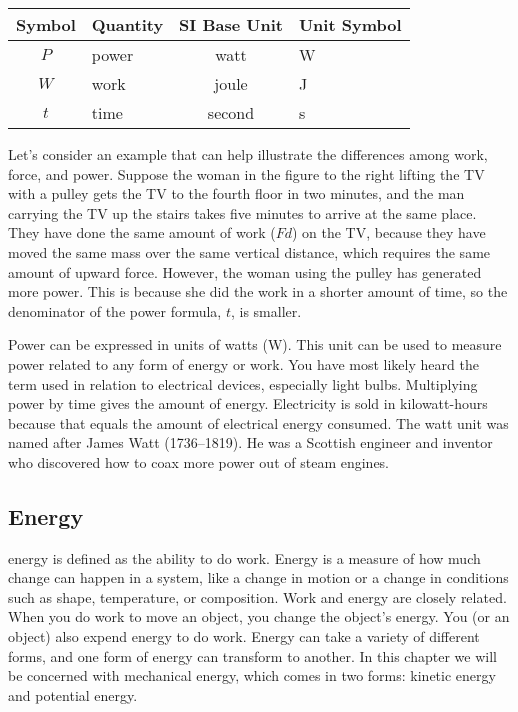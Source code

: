 \documentclass[main.tex]{subfiles}
\begin{document}
\begin{center}
    \begin{tabular}{cl|cl}
    \hline
    \textbf{Symbol} & \textbf{Quantity} & \textbf{SI Base Unit} & \textbf{Unit Symbol}  \\
    \hline\hline
    \rule{0pt}{2.5ex}
        $P$ & power & watt & W\\
        $W$ & work & joule & J\\
        $t$ & time & second & s\\
    \hline
    \end{tabular}
\end{center}


Let's consider an example that can help illustrate the differences among work, force, and power. Suppose the woman in the figure to the right lifting the TV with a pulley gets the TV to the fourth floor in two minutes, and the man carrying the TV up the stairs takes five minutes to arrive at the same place. They have done the same amount of work ($F d$) on the TV, because they have moved the same mass over the same vertical distance, which requires the same amount of upward force. However, the woman using the pulley has generated more power. This is because she did the work in a shorter amount of time, so the denominator of the power formula, $t$, is smaller.



Power can be expressed in units of watts (W). This unit can be used to measure power related to any form of energy or work. You have most likely heard the term used in relation to electrical devices, especially light bulbs. Multiplying power by time gives the amount of energy. Electricity is sold in kilowatt-hours because that equals the amount of electrical energy consumed. The watt unit was named after James Watt (1736--1819). He was a Scottish engineer and inventor who discovered how to coax more power out of steam engines.

\vspace{1em}

\cyanhrule

\subsection{Energy} \label{iHOPFl}

\Gls{energy} is defined as the ability to do work. Energy is a measure of how much change can happen in a system, like a change in motion or a change in conditions such as shape, temperature, or composition. Work and energy are closely related. When you do work to move an object, you change the object's energy. You (or an object) also expend energy to do work. Energy can take a variety of different forms, and one form of energy can transform to another. In this chapter we will be concerned with \gls{mechanical energy}, which comes in two forms: kinetic energy and potential energy.
\end{document}

